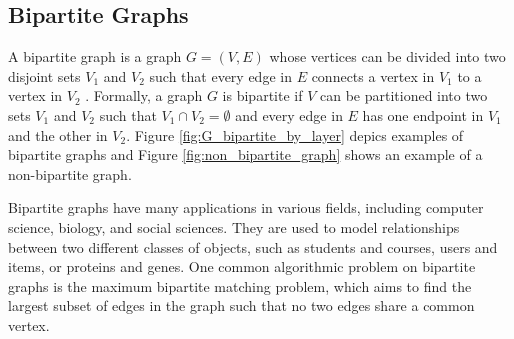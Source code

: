         \subsection{Bipartite Graphs}

            A bipartite graph is a graph \( G = (V, E) \) whose vertices can be divided into two disjoint sets \( V_1 \) and \( V_2 \) such that every edge in \( E \) connects a vertex in \( V_1 \) to a vertex in \( V_2 \) \cite{cormen, bondy1976graph}.
            Formally, a graph \( G \) is bipartite if \( V \) can be partitioned into two sets \( V_1 \) and \( V_2 \) such that \( V_1 \cap V_2 = \emptyset \) and every edge in \( E \) has one endpoint in \( V_1 \) and the other in \( V_2 \). Figure \ref{fig:G_bipartite_by_layer} depics examples of bipartite graphs and Figure \ref{fig:non_bipartite_graph} shows an example of a non-bipartite graph.
            
            Bipartite graphs have many applications in various fields, including computer science, biology, and social sciences. They are used to model relationships between two different classes of objects, such as students and courses, users and items, or proteins and genes. 
            One common algorithmic problem on bipartite graphs is the maximum bipartite matching problem, which aims to find the largest subset of edges in the graph such that no two edges share a common vertex.
            

